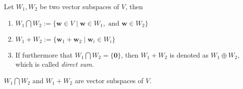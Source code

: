 \begin{definition}
Let $W_1,W_2$ be two vector subspaces of $V$, then
\begin{enumerate}
\item
$W_1\bigcap W_2:=\{\bm w\in V\mid\bm w\in W_1,\text{ and }\bm w\in W_2\}$
\item
$W_1+W_2:=\{\bm w_1+\bm w_2\mid\bm w_i\in W_i\}$
\item
If furthermore that $W_1\bigcap W_2=\{\bm0\}$, then $W_1+W_2$ is denoted as $W_1\oplus W_2$, which is called \emph{direct sum}.
\end{enumerate}
\end{definition}
\begin{proposition}
$W_1\bigcap W_2$ and $W_1+W_2$ are vector subspaces of $V$.
\end{proposition}



















